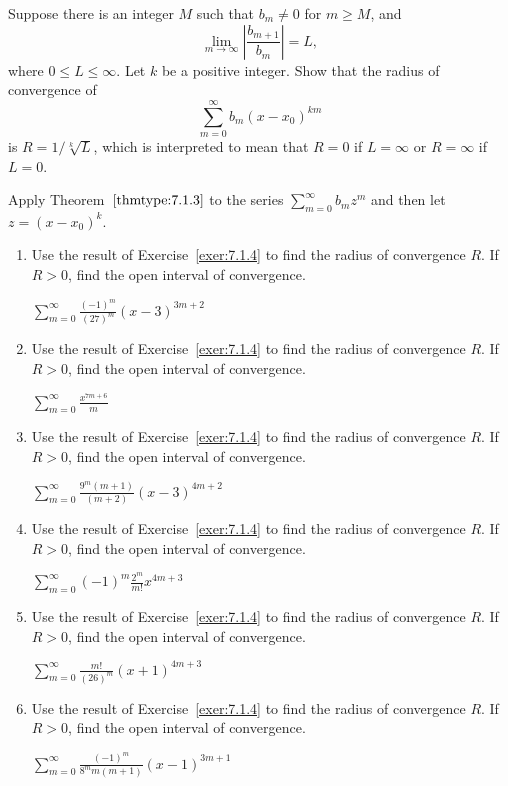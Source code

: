 \documentclass{ximera}
\begin{document}
\begin{problem}\label{exer:7.1.4}
Suppose there is an integer $M$ such that $b_m\ne0$ for $m\ge M$,
and
$$
\lim_{m\to\infty}\left|\frac{b_{m+1}}{b_m}\right|=L,
$$
where $0\le L\le\infty$. Let $k$ be a positive integer. Show that the
radius of convergence of
$$
\sum_{m=0}^\infty b_m(x-x_0)^{km}
$$
is $R=1/\sqrt[k]L$, which is interpreted to mean that $R=0$ if
$L=\infty$ or $R=\infty$ if $L=0$.

\begin{hint}
Apply Theorem~$\ref{thmtype:7.1.3}$
to the series $\sum_{m=0}^\infty b_mz^m$ and then let $z=(x-x_0)^k$.    
\end{hint}
\end{problem}

\begin{problem}\label{exer:7.1.5}

\begin{enumerate}
\item Use the result of Exercise~\ref{exer:7.1.4} to find the radius of convergence $R$. If $R>0$, find the open interval of convergence.
    
 $\sum_{m=0}^\infty\frac{(-1)^m}{(27)^m}(x-3)^{3m+2}$
 
\item Use the result of Exercise~\ref{exer:7.1.4} to find the radius of convergence $R$. If $R>0$, find the open interval of convergence.
 
 $\sum_{m=0}^\infty\frac{x^{7m+6}}{m}$ 
 
\item Use the result of Exercise~\ref{exer:7.1.4} to find the radius of convergence $R$. If $R>0$, find the open interval of convergence.
 
 $\sum_{m=0}^\infty\frac{9^m(m+1)}{(m+2)}(x-3)^{4m+2}$
 
\item Use the result of Exercise~\ref{exer:7.1.4} to find the radius of convergence $R$. If $R>0$, find the open interval of convergence.
 
 $\sum_{m=0}^\infty(-1)^m\frac{2^m}{m!}x^{4m+3}$
 
\item Use the result of Exercise~\ref{exer:7.1.4} to find the radius of convergence $R$. If $R>0$, find the open interval of convergence.
 
 $\sum_{m=0}^\infty\frac{m!}{(26)^m}(x+1)^{4m+3}$
 
\item Use the result of Exercise~\ref{exer:7.1.4} to find the radius of convergence $R$. If $R>0$, find the open interval of convergence.
 
 $\sum_{m=0}^\infty\frac{(-1)^m}{8^mm(m+1)}(x-1)^{3m+1}$
\end{enumerate}
\end{problem}
\end{document}
